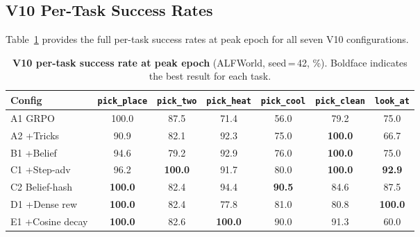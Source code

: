 
\subsection{V10 Per-Task Success Rates}

Table~\ref{tab:v10_pertask} provides the full per-task success rates at peak epoch
for all seven V10 configurations.

\begin{table}[h]
  \centering
  \caption{%
    \textbf{V10 per-task success rate at peak epoch} (ALFWorld, seed\,=\,42, \%).
    Boldface indicates the best result for each task.
  }
  \label{tab:v10_pertask}
  \vspace{4pt}
  \small
  \renewcommand{\arraystretch}{1.15}
  \begin{tabular}{@{}lcccccc@{}}
    \toprule
    \textbf{Config}
      & \texttt{pick\_place}
      & \texttt{pick\_two}
      & \texttt{pick\_heat}
      & \texttt{pick\_cool}
      & \texttt{pick\_clean}
      & \texttt{look\_at} \\
    \midrule
    A1 GRPO                & 100.0          & 87.5           & 71.4           & 56.0           & 79.2            & 75.0  \\
    A2 +Tricks             & 90.9           & 82.1           & 92.3           & 75.0           & \textbf{100.0}  & 66.7  \\
    B1 +Belief             & 94.6           & 79.2           & 92.9           & 76.0           & \textbf{100.0}  & 75.0  \\
    C1 +Step-adv           & 96.2           & \textbf{100.0} & 91.7           & 80.0           & \textbf{100.0}  & \textbf{92.9} \\
    C2 Belief-hash         & \textbf{100.0} & 82.4           & 94.4           & \textbf{90.5}  & 84.6            & 87.5  \\
    D1 +Dense rew          & \textbf{100.0} & 82.4           & 77.8           & 81.0           & 80.8            & \textbf{100.0} \\
    E1 +Cosine decay       & \textbf{100.0} & 82.6           & \textbf{100.0} & 90.0           & 91.3            & 60.0  \\
    \bottomrule
  \end{tabular}
\end{table}

